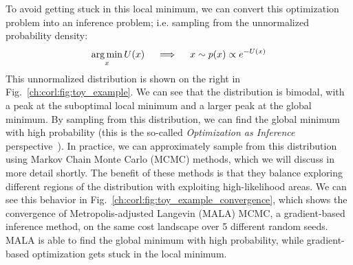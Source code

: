To avoid getting stuck in this local minimum, we can convert this optimization problem into an inference problem; i.e. sampling from the unnormalized probability density:
\begin{align*}
    \operatorname*{arg\,min}_x U(x) \quad \implies \quad x \sim p(x) \propto e^{-U(x)}
\end{align*}
%
This unnormalized distribution is shown on the right in Fig.~\ref{ch:corl:fig:toy_example}. We can see that the distribution is bimodal, with a peak at the suboptimal local minimum and a larger peak at the global minimum. By sampling from this distribution, we can find the global minimum with high probability (this is the so-called \textit{Optimization as Inference} perspective~\cite{maSamplingCanBe2019,levineReinforcementLearningControl2018a}). In practice, we can approximately sample from this distribution using Markov Chain Monte Carlo (MCMC) methods, which we will discuss in more detail shortly. The benefit of these methods is that they balance exploring different regions of the distribution with exploiting high-likelihood areas. We can see this behavior in Fig.~\ref{ch:corl:fig:toy_example_convergence}, which shows the convergence of Metropolis-adjusted Langevin (MALA) MCMC, a gradient-based inference method, on the same cost landscape over 5 different random seeds. MALA is able to find the global minimum with high probability, while gradient-based optimization gets stuck in the local minimum.

